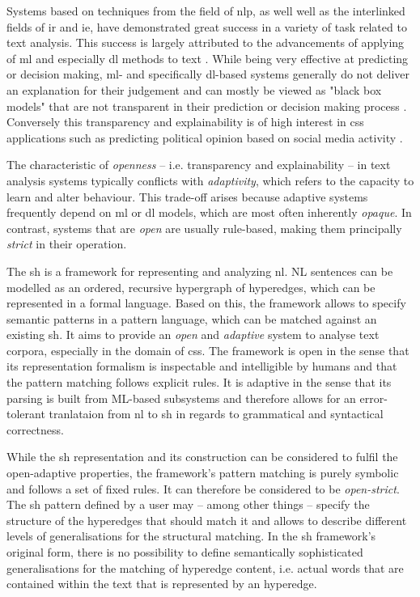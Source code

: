 \documentclass[11pt, numbers=noenddot]{scrreprt}
\let\cite\parencite  %
\begin{document}
Systems based on techniques from the field of \gls{nlp}, as well well as the interlinked fields of \gls{ir} and \gls{ie}, have demonstrated great success in a variety of task related to text analysis. This success is largely attributed to the advancements of applying of \gls{ml}  and especially \gls{dl} methods to text \cite{hirschbergAdvancesNaturalLanguage2015, qiuPretrainedModelsNatural2020}. While being very effective at predicting or decision making, \gls{ml}- and specifically \gls{dl}-based systems generally do not deliver an explanation for their judgement and can mostly be viewed as "black box models" that are not transparent in their prediction or decision making process \cite{rudinStopExplainingBlack2019}. Conversely this transparency and explainability is of high interest in \gls{css} applications such as predicting political opinion based on social media activity \cite{wilkersonLargeScaleComputerizedText2017}.

The characteristic of \textit{openness} -- i.e. transparency and explainability -- in text analysis systems typically conflicts with \textit{adaptivity}, which refers to the capacity to learn and alter behaviour. This trade-off arises because adaptive systems frequently depend on \gls{ml} or \gls{dl} models, which are most often inherently \textit{opaque}. In contrast, systems that are \textit{open} are usually rule-based, making them principally \textit{strict} in their operation.

The \gls{sh} \cite{menezesSemanticHypergraphs2021} is a framework for representing and analyzing \gls{nl}. NL sentences can be modelled as an ordered, recursive hypergraph of hyperedges, which can be represented in a formal language. Based on this, the framework allows to specify semantic patterns in a pattern language, which can be matched against an existing \gls{sh}.
It aims to provide an \textit{open} and \textit{adaptive} system to analyse text corpora, especially in the domain of \gls{css}. The framework is open in the sense that its representation formalism is inspectable and intelligible by humans and that the pattern matching follows explicit rules. It is adaptive in the sense that its parsing is built from ML-based subsystems and therefore allows for an error-tolerant tranlataion from \gls{nl} to \gls{sh} in regards to grammatical and syntactical correctness.

While the \gls{sh} representation and its construction can be considered to fulfil the open-adaptive properties, the framework's pattern matching is purely symbolic and follows a set of fixed rules. It can therefore be considered to be \textit{open-strict}. The \gls{sh} pattern defined by a user may -- among other things -- specify the structure of the hyperedges that should match it and allows  to describe different levels of generalisations for the structural matching. In the \gls{sh} framework's original form, there is no possibility to define semantically sophisticated generalisations for the matching of hyperedge content, i.e. actual words that are contained within the text that is represented by an hyperedge.
\end{document}
